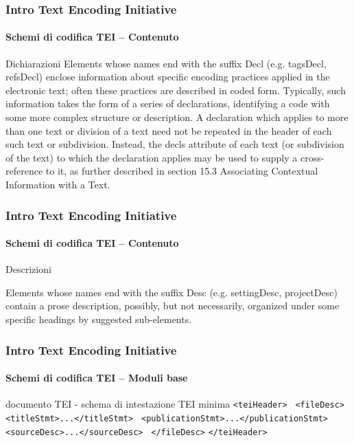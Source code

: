 \begin{frame}
	\frametitle{Intro Text Encoding Initiative}
	\framesubtitle{Schemi di codifica TEI – Contenuto}
	\addtocounter{nframe}{1}

    \begin{block}{Dichiarazioni}
        Elements whose names end with the suffix Decl (e.g. tagsDecl, refsDecl) enclose information about specific encoding practices applied in the electronic text; often these practices are described in coded form. Typically, such information takes the form of a series of declarations, identifying a code with some more complex structure or description. A declaration which applies to more than one text or division of a text need not be repeated in the header of each such text or subdivision. Instead, the decls attribute of each text (or subdivision of the text) to which the declaration applies may be used to supply a cross-reference to it, as further described in section 15.3 Associating Contextual Information with a Text.
    \end{block}
\textit{}

\end{frame}


\begin{frame}
	\frametitle{Intro Text Encoding Initiative}
	\framesubtitle{Schemi di codifica TEI – Contenuto}
	\addtocounter{nframe}{1}

    \begin{block}{Descrizioni}

        Elements whose names end with the suffix Desc (e.g. settingDesc, projectDesc) contain a prose description, possibly, but not necessarily, organized under some specific headings by suggested sub-elements.

    \end{block}
\textit{}

\end{frame}



\begin{frame}
	\frametitle{Intro Text Encoding Initiative}
	\framesubtitle{Schemi di codifica TEI – Moduli base}
	\addtocounter{nframe}{1}

	\begin{block}{documento TEI - schema di intestazione TEI minima}
        \texttt{<teiHeader>}
        \texttt{ <fileDesc>}
        \texttt{  <titleStmt>...</titleStmt>}
        \texttt{  <publicationStmt>...</publicationStmt>}
        \texttt{  <sourceDesc>...</sourceDesc>}
        \texttt{ </fileDesc>}
        \texttt{</teiHeader>}
    \end{block}
    

\end{frame}


